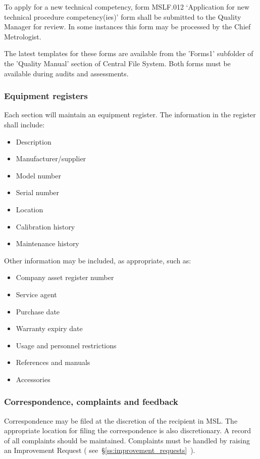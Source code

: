 To apply for a new technical competency, form MSLF.012 `Application for new technical procedure competency(ies)' form shall be submitted to the Quality Manager for review.  In some instances this form may be processed by the Chief Metrologist.

The latest templates for these forms are available from the 'Forms1' subfolder of the 'Quality Manual' section of Central File System.  Both forms must be available during audits and assessments.

\subsubsection{Equipment registers}
\label{sss:equipment_register}
Each section will maintain an equipment register. The information in the register shall include: 
\begin{itemize}
\item Description 

\item Manufacturer/supplier 
\item Model number 
\item Serial number 
\item Location
\item Calibration history 
\item Maintenance history
\end{itemize}
Other information may be included, as appropriate, such as:
\begin{itemize}\item Company asset register number 
\item Service agent 
\item Purchase date 
\item Warranty expiry date 
\item Usage and personnel restrictions
\item References and manuals
\item Accessories
\end{itemize}

\subsubsection{Correspondence, complaints and feedback}
Correspondence may be filed at the discretion of the recipient in MSL. The appropriate location for filing the correspondence is also discretionary. 
A record of all complaints should be maintained. Complaints must be handled by raising an Improvement Request ( see~\S\ref{ss:improvement_requests}~).


